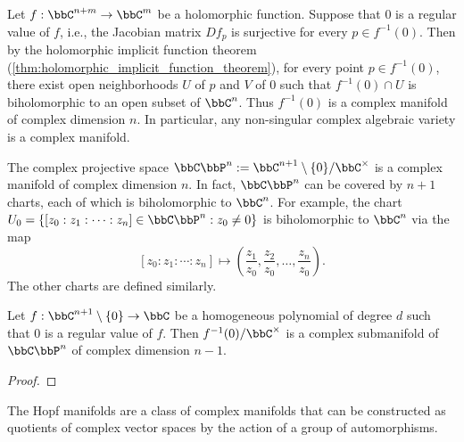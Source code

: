     \begin{example}\label{eg:complex_manifold_by_holomorphic_implicit_function_theorem}
        Let \(f: \bbC^{n+m}\to \bbC^m\) be a holomorphic function.
        Suppose that \(0\) is a regular value of \(f\), i.e., the Jacobian matrix \(Df_p\) is surjective for every \(p\in f^{-1}(0)\).
        Then by the holomorphic implicit function theorem (\cref{thm:holomorphic_implicit_function_theorem}),
        for every point \(p\in f^{-1}(0)\), there exist open neighborhoods \(U\) of \(p\) and \(V\) of \(0\) such that \(f^{-1}(0)\cap U\) is biholomorphic to an open subset of \(\bbC^n\).
        Thus \(f^{-1}(0)\) is a complex manifold of complex dimension \(n\).
        In particular, any non-singular complex algebraic variety is a complex manifold.
    \end{example}

    \begin{example}\label{eg:complex_projective_space_as_complex_manifold}
        The complex projective space \(\bbC\bbP^n:= \bbC^{n+1}\setminus \{0\}/\bbC^\times\) is a complex manifold of complex dimension \(n\).
        In fact, \(\bbC\bbP^n\) can be covered by \(n+1\) charts, each of which is biholomorphic to \(\bbC^n\).
        For example, the chart \(U_0 = \{[z_0: z_1: \cdots: z_n]\in \bbC\bbP^n: z_0\neq 0\}\) is biholomorphic to \(\bbC^n\) via the map
        \[
            [z_0: z_1: \cdots: z_n] \mapsto \left(\frac{z_1}{z_0}, \frac{z_2}{z_0}, \ldots, \frac{z_n}{z_0}\right).
        \]
        The other charts are defined similarly.
    \end{example}

    \begin{proposition}\label{prop:zero_locus_of_homogeneous_polynomial_in_CPn}
        Let \(f:\bbC^{n+1}\setminus \{0\} \to \bbC\) be a homogeneous polynomial of degree \(d\) such that \(0\) is a regular value of \(f\).
        Then \(f^{-1}(0)/\bbC^\times\) is a complex submanifold of \(\bbC\bbP^n\) of complex dimension \(n-1\).
    \end{proposition}
    \begin{proof}
    \end{proof}

    \begin{example}\label{eg:hopf_manifolds}
        The Hopf manifolds are a class of complex manifolds that can be constructed as quotients of complex vector spaces by the action of a group of automorphisms.
    \end{example}

